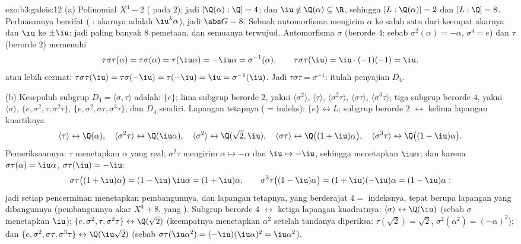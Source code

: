 \begin{solution}{exo:b3:galois:12}
(a) Polinomial $X^4 - 2$  ( pada $2$):
jadi $[\Q(\alpha):\Q] = 4$; dan $\iu \notin \Q(\alpha) \subseteq \R$,
sehingga $[L : \Q(\alpha)] = 2$ dan $[L:\Q] = 8$. Perluasannya bersifat
 ( : akarnya
adalah $\iu^k\alpha$), jadi $\abs G = 8$. Sebuah automorfisma mengirim
$\alpha$ ke salah satu dari keempat akarnya dan $\iu$ ke $\pm\iu$:
jadi paling banyak $8$ pemetaan, dan semuanya terwujud. Automorfisma $\sigma$ (berorde
$4$: sebab $\sigma^2(\alpha) = -\alpha$, $\sigma^4 = e$) dan $\tau$
(berorde $2$) memenuhi
\[
\tau\sigma\tau(\alpha) = \tau\sigma(\alpha) =
\tau(\iu\alpha) = -\iu\alpha = \sigma^{-1}(\alpha),
\qquad \tau\sigma\tau(\iu) = \iu\cdot(-1)(-1) = \iu ,
\]
atau lebih cermat: $\tau\sigma\tau(\iu) = \tau\sigma(-\iu) =
\tau(-\iu) = \iu = \sigma^{-1}(\iu)$. Jadi $\tau\sigma\tau =
\sigma^{-1}$: itulah penyajian $D_4$.

(b) Kesepuluh subgrup $D_4 = \langle\sigma,
\tau\rangle$ adalah: $\{e\}$; lima subgrup berorde $2$, yakni
$\langle\sigma^2\rangle$, $\langle\tau\rangle$,
$\langle\sigma^2\tau\rangle$, $\langle\sigma\tau\rangle$,
$\langle\sigma^3\tau\rangle$; tiga subgrup berorde $4$, yakni
$\langle\sigma\rangle$, $\{e, \sigma^2, \tau,
\sigma^2\tau\}$, $\{e, \sigma^2, \sigma\tau,
\sigma^3\tau\}$; dan $D_4$ sendiri. Lapangan tetapnya ( = indeks):
$\{e\} \leftrightarrow L$; subgrup berorde $2$
$\leftrightarrow$ kelima lapangan kuartiknya
\[
\langle\tau\rangle \leftrightarrow \Q(\alpha),\quad
\langle\sigma^2\tau\rangle \leftrightarrow \Q(\iu\alpha),
\quad
\langle\sigma^2\rangle \leftrightarrow \Q(\sqrt2, \iu),\quad
\langle\sigma\tau\rangle \leftrightarrow
\Q\bigl((1+\iu)\alpha\bigr),\quad
\langle\sigma^3\tau\rangle \leftrightarrow
\Q\bigl((1-\iu)\alpha\bigr) .
\]
Pemeriksaannya: $\tau$ menetapkan $\alpha$ yang real; $\sigma^2\tau$ mengirim
$\alpha \mapsto -\alpha$ dan $\iu \mapsto -\iu$, sehingga menetapkan
$\iu\alpha$; dan karena $\sigma\tau(\alpha) = \iu\alpha$,
$\sigma\tau(\iu) = -\iu$:
\[
\sigma\tau\bigl((1+\iu)\alpha\bigr) =
(1 - \iu)\,\iu\alpha = (1 + \iu)\alpha,
\qquad
\sigma^3\tau\bigl((1-\iu)\alpha\bigr) =
(1 + \iu)(-\iu)\alpha = (1 - \iu)\alpha :
\]
jadi setiap pencerminan menetapkan pembangunnya, dan lapangan tetapnya,
yang berderajat $4 =$ indeksnya, tepat berupa lapangan yang dibangunnya
(pembangunnya akar $X^4 + 8$, yang ). Subgrup berorde $4$
$\leftrightarrow$ ketiga lapangan kuadratnya:
$\langle\sigma\rangle \leftrightarrow \Q(\iu)$ (sebab $\sigma$
menetapkan $\iu$); $\{e, \sigma^2, \tau, \sigma^2\tau\}
\leftrightarrow \Q(\sqrt2)$ (keempatnya menetapkan $\alpha^2$ setelah
tandanya diperiksa: $\tau(\sqrt2) = \sqrt2$, $\sigma^2(\alpha^2) =
(-\alpha)^2$); dan $\{e, \sigma^2, \sigma\tau, \sigma^3\tau\}
\leftrightarrow \Q(\iu\sqrt2)$ (sebab $\sigma\tau(\iu\alpha^2) =
(-\iu)(\iu\alpha)^2 = \iu\alpha^2$).


\end{solution}
